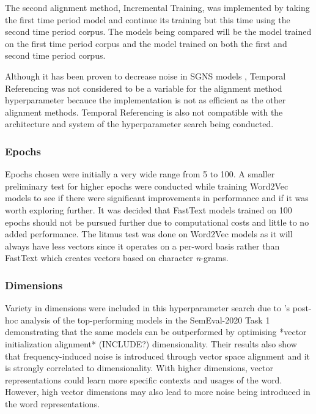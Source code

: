 The second alignment method, Incremental Training, was implemented by taking the first time period model and continue its training but this time using the second time period corpus. The models being compared will be the model trained on the first time period corpus and the model trained on both the first and second time period corpus.

Although it has been proven to decrease noise in SGNS models \citep{dubossarsky-etal-2019-time}, Temporal Referencing was not considered to be a variable for the alignment method hyperparameter becauce the implementation is not as efficient as the other alignment methods. Temporal Referencing is also not compatible with the architecture and system of the hyperparameter search being conducted. 


\subsubsection{Epochs} 
\label{exp-epochs}

Epochs chosen were initially a very wide range from 5 to 100. A smaller preliminary test for higher epochs were conducted while training Word2Vec models to see if there were significant improvements in performance and if it was worth exploring further. It was decided that FastText models trained on 100 epochs should not be pursued further due to computational costs and little to no added performance. The litmus test was done on Word2Vec models as it will always have less vectors since it operates on a per-word basis rather than FastText which creates vectors based on character \emph{n}-grams. 

\subsubsection{Dimensions}
Variety in dimensions were included in this hyperparameter search due to \citet{kaiser-etal-2020-ims}’s post-hoc analysis of the top-performing models in the SemEval-2020 Task 1 demonstrating that the same models can be outperformed by optimising *vector initialization alignment* (INCLUDE?) dimensionality. Their results also show that frequency-induced noise is introduced through vector space alignment and it is strongly correlated to dimensionality. With higher dimensions, vector representations could learn more specific contexts and usages of the word. However, high vector dimensions may also lead to more noise being introduced in the word representations. 

